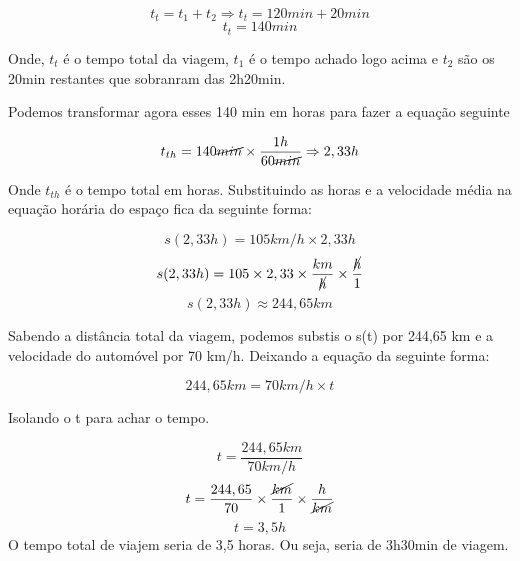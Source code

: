 \documentclass[a4paper, 12pt]{article}
\begin{document}
\begin{flushleft}
		\begin{equation*}
			t_t = t_1 + t_2 \Rightarrow t_t = 120 min + 20 min
		\end{equation*}
		\begin{equation*}
			t_t = 140 min
		\end{equation*}
		
		
		Onde, $t_t$ é o tempo total da viagem, $t_1$ é o tempo achado logo acima e $t_2$ são os 20min restantes que sobranram das 2h20min. 
		
		Podemos transformar agora esses 140 min em horas para fazer a equação seguinte
		
		\begin{equation*}
			t_{th}= 140 \cancel{min} \times \frac{1h}{60 \cancel{min}} \Rightarrow 2,33 h 
		\end{equation*}
		
		Onde $t_{th}$ é o tempo total em horas. Substituindo as horas e a velocidade média na equação horária do espaço fica da seguinte forma:
		
		\begin{equation*}
			s(2,33h) =105 km/h \times 2,33h
		\end{equation*}
		\begin{equation*}
			s(2,33h) =105 \times 2,33 \times \frac{km}{\cancel{h}} \times \frac{\cancel{h}}{1}
		\end{equation*}
		\begin{equation*}
			s(2,33h) \approx 244,65 km
		\end{equation*}
		
		Sabendo a distância total da viagem, podemos substis o s(t) por 244,65 km e a velocidade do automóvel por 70 km/h. Deixando a equação da seguinte forma:
		
		\begin{equation*}
			244,65 km = 70 km/h\times t 
		\end{equation*}
		
		Isolando o t para achar o tempo.
		
		\begin{equation*}
			t = \frac{244,65 km}{70 km/h} 
		\end{equation*}
		\begin{equation*}
			t = \frac{244,65}{70} \times \frac{\cancel{km}}{1} \times \frac{h}{\cancel{km}} 
		\end{equation*}
		\begin{equation*}
			t = 3,5h 
		\end{equation*}
		O tempo total de viajem seria de 3,5 horas. Ou seja, seria de 3h30min de viagem.
		

\end{flushleft}
\end{document}
